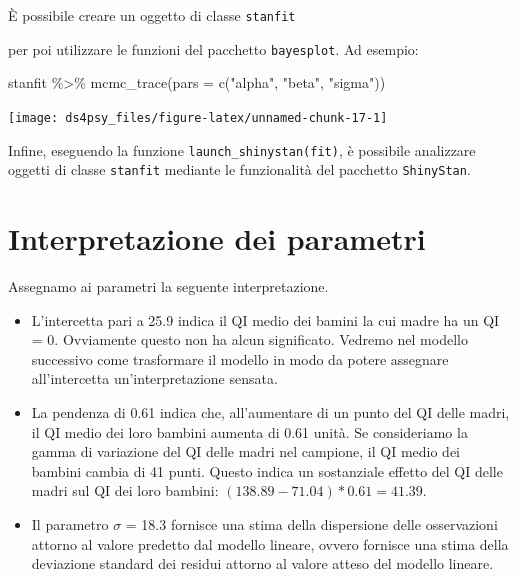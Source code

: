 \documentclass[
  11pt,
]{krantz}
\makeatletter
\newenvironment{Shaded}{\begin{snugshade}}{\end{snugshade}}
\newcommand{\AttributeTok}[1]{\textcolor[rgb]{0.61,0.61,0.61}{#1}}
\newcommand{\FunctionTok}[1]{\textcolor[rgb]{0,0,0}{#1}}
\newcommand{\NormalTok}[1]{#1}
\newcommand{\OtherTok}[1]{\textcolor[rgb]{0.37,0.37,0.37}{#1}}
\newcommand{\SpecialCharTok}[1]{\textcolor[rgb]{0,0,0}{#1}}
\newcommand{\StringTok}[1]{\textcolor[rgb]{0.5,0.5,0.5}{#1}}
\newenvironment{kframe}{%
\medskip{}
\setlength{\fboxsep}{.8em}
 \def\at@end@of@kframe{}%
 \ifinner\ifhmode%
  \def\at@end@of@kframe{\end{minipage}}%
  \begin{minipage}{\columnwidth}%
 \fi\fi%
 \def\FrameCommand##1{\hskip\@totalleftmargin \hskip-\fboxsep
 \colorbox{shadecolor}{##1}\hskip-\fboxsep
     \hskip-\linewidth \hskip-\@totalleftmargin \hskip\columnwidth}%
 \MakeFramed {\advance\hsize-\width
   \@totalleftmargin\z@ \linewidth\hsize
   \@setminipage}}%
 {\par\unskip\endMakeFramed%
 \at@end@of@kframe}
\renewenvironment{Shaded}{\begin{kframe}}{\end{kframe}}
\theoremstyle{definition}
\theoremstyle{definition}
\theoremstyle{definition}
\theoremstyle{definition}
\theoremstyle{remark}
\makeatother
\begin{document}
È possibile creare un oggetto di classe \texttt{stanfit}

\begin{Shaded}
\end{Shaded}

per poi utilizzare le funzioni del pacchetto \texttt{bayesplot}. Ad esempio:

\begin{Shaded}
\begin{Highlighting}[]
\NormalTok{stanfit }\SpecialCharTok{\%\textgreater{}\%}
  \FunctionTok{mcmc\_trace}\NormalTok{(}\AttributeTok{pars =} \FunctionTok{c}\NormalTok{(}\StringTok{"alpha"}\NormalTok{, }\StringTok{"beta"}\NormalTok{, }\StringTok{"sigma"}\NormalTok{))}
\end{Highlighting}
\end{Shaded}

\begin{center}\texttt{[image: ds4psy\_files/figure-latex/unnamed-chunk-17-1]} \end{center}

Infine, eseguendo la funzione \texttt{launch\_shinystan(fit)}, è possibile analizzare oggetti di classe \texttt{stanfit} mediante le funzionalità del pacchetto \texttt{ShinyStan}.

\hypertarget{interpretazione-dei-parametri}{%
\section{Interpretazione dei parametri}\label{interpretazione-dei-parametri}}

Assegnamo ai parametri la seguente interpretazione.

\begin{itemize}
\item
  L'intercetta pari a 25.9 indica il QI medio dei bamini la cui madre ha un QI = 0. Ovviamente questo non ha alcun significato. Vedremo nel modello successivo come trasformare il modello in modo da potere assegnare all'intercetta un'interpretazione sensata.
\item
  La pendenza di 0.61 indica che, all'aumentare di un punto del QI delle madri, il QI medio dei loro bambini aumenta di 0.61 unità. Se consideriamo la gamma di variazione del QI delle madri nel campione, il QI medio dei bambini cambia di 41 punti. Questo indica un sostanziale effetto del QI delle madri sul QI dei loro bambini: \((138.89 - 71.04) * 0.61 = 41.39\).
\item
  Il parametro \(\sigma\) = 18.3 fornisce una stima della dispersione delle osservazioni attorno al valore predetto dal modello lineare, ovvero fornisce una stima della deviazione standard dei residui attorno al valore atteso del modello lineare.
\end{itemize}
\end{document}
